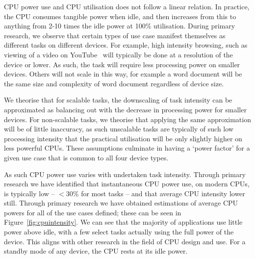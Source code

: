 \documentclass[conference]{IEEEtran}
\begin{document}
CPU power use and CPU utilisation does not follow a linear
relation. In practice, the CPU consumes tangible power when idle, and
then increases from this to anything from 2-10 times the idle power at
100\% utilisation. During primary research, we observe that certain
types of use case manifest themselves as different tasks on different
devices. For example, high intensity browsing, such as viewing of a
video on YouTube~\cite{schien-et-al:2013} will typically be done at a
resolution of the device or lower. As such, the task will require less
processing power on smaller devices. Others will not scale in this
way, for example a word document will be the same size and complexity
of word document regardless of device size.

We theorise that for scalable tasks, the downscaling of task
intensity can be approximated as balancing out with the decrease in
processing power for smaller devices. For non-scalable tasks, we
theorise that applying the same approximation will be of
little inaccuracy, as such unscalable tasks are typically of such low
processing intensity that the practical utilisation will be only
slightly higher on less powerful CPUs.  These assumptions culminate in
having a `power factor' for a given use case that is common to all
four device types.

As such CPU power use varies with undertaken task intensity.
Through primary research we have identified that
instantaneous CPU power use, on modern CPUs, is typically low --
$<$30\% for most tasks -- and that average CPU intensity lower
still. Through primary research we have obtained estimations of
average CPU powers for all of the use cases defined; these can be seen
in Figure~\ref{fig:cpuintensity}. We can see that the majority of
applications use little power above idle, with a few select tasks
actually using the full power of the device. This aligns with other
research in the field of CPU design and use. For a standby mode of any
device, the CPU rests at its idle power.
\end{document}
